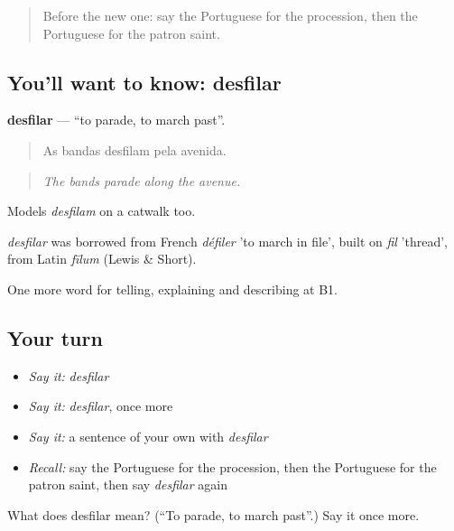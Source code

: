 \label{lesson:PT-C446-desfilar}



\begin{quote}
Before the new one: say the Portuguese for the procession, then the Portuguese for the patron saint.
\end{quote}

\subsection*{You'll want to know: desfilar}
\textbf{desfilar} — \textquotedblleft{}to parade, to march past\textquotedblright{}.

\begin{quote}
As bandas desfilam pela avenida.
\end{quote}

\begin{quote}
\emph{The bands parade along the avenue.}
\end{quote}

Models \emph{desfilam} on a catwalk too.

\begin{cousinweb}
\emph{desfilar} was borrowed from French \emph{défiler} 'to march in file', built on \emph{fil} 'thread', from Latin \emph{fīlum} (Lewis \& Short).
\end{cousinweb}

\begin{grammarlens}[title={What you've built}]
One more word for telling, explaining and describing at B1.
\end{grammarlens}

\subsection*{Your turn}
\begin{itemize}
\raggedright
  \item \emph{Say it:} \emph{desfilar}
  \item \emph{Say it:} \emph{desfilar}, once more
  \item \emph{Say it:} a sentence of your own with \emph{desfilar}
  \item \emph{Recall:} say the Portuguese for the procession, then the Portuguese for the patron saint, then say \emph{desfilar} again
\end{itemize}

\begin{tcolorbox}[breakable,colback=teal!4,colframe=teal!35!black,title={Before you move on}]
What does desfilar mean? (\textquotedblleft{}To parade, to march past\textquotedblright{}.) Say it once more.
\end{tcolorbox}
